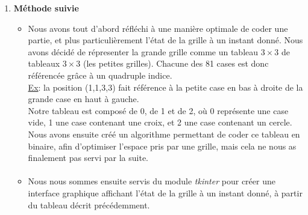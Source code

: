 \documentclass[10pt]{article}
\begin{document}
\begin{enumerate}
\paragraph{}
\item \textbf{Méthode suivie}

\begin{itemize}
    \item Nous avons tout d'abord réfléchi à une manière optimale de coder une partie, et plus particulièrement l'état de la grille à un instant donné. Nous avons décidé de répresenter  la grande grille comme un tableau $3\times3$ de tableaux $3\times3$ (les petites grilles). Chacune des 81 cases est donc référencée grâce à un quadruple indice. \\
    \underline{Ex}: la position (1,1,3,3) fait référence à la petite case en bas à droite de la grande case en haut à gauche. \\ 
    Notre tableau est composé de 0, de 1 et de 2, où 0 représente une case vide, 1 une case contenant une croix, et 2 une case contenant un cercle. \\
    Nous avons ensuite créé un algorithme permettant de coder ce tableau en binaire, afin d'optimiser l'espace pris par une grille, mais cela ne nous as finalement pas servi par la suite.
   \paragraph{}
    \item Nous nous sommes ensuite servis du module \textit{tkinter} pour créer une interface graphique affichant l'état de la grille à un instant donné, à partir du tableau décrit précédemment. 

\end{itemize}
\end{enumerate}
\end{document}
